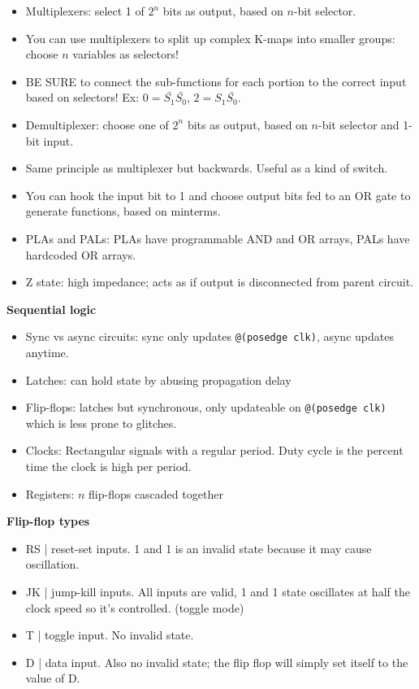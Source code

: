 \documentclass{article}
\begin{document}
\begin{itemize}
    \item Multiplexers: select 1 of $2^n$ bits as output, based on $n$-bit selector.
    \item You can use multiplexers to split up complex K-maps into smaller groups: choose $n$ variables as selectors!
    \item BE SURE to connect the sub-functions for each portion to the correct input based on selectors! Ex: $0 = \bar{S_1}\bar{S_0}$, $2 = S_1\bar{S_0}$.
    \item Demultiplexer: choose one of $2^n$ bits as output, based on $n$-bit selector and 1-bit input.
    \item Same principle as multiplexer but backwards. Useful as a kind of switch.
    \item You can hook the input bit to 1 and choose output bits fed to an OR gate to generate functions, based on minterms.
    \item PLAs and PALs: PLAs have programmable AND and OR arrays, PALs have hardcoded OR arrays.
    \item Z state: high impedance; acts as if output is disconnected from parent circuit.
\end{itemize}
\textbf{Sequential logic}
\begin{itemize}
    \item Sync vs async circuits: sync only updates \texttt{@(posedge clk)}, async updates anytime.
    \item Latches: can hold state by abusing propagation delay
    \item Flip-flops: latches but synchronous, only updateable on \texttt{@(posedge clk)} which is less prone to glitches.
    \item Clocks: Rectangular signals with a regular period. Duty cycle is the percent time the clock is high per period.
    \item Registers: $n$ flip-flops cascaded together
\end{itemize}
\textbf{Flip-flop types}
\begin{itemize}
    \item RS | reset-set inputs. 1 and 1 is an invalid state because it may cause oscillation.
    \item JK | jump-kill inputs. All inputs are valid, 1 and 1 state oscillates at half the clock speed so it's controlled. (toggle mode)
    \item T | toggle input. No invalid state.
    \item D | data input. Also no invalid state; the flip flop will simply set itself to the value of D.
\end{itemize}
\end{document}
